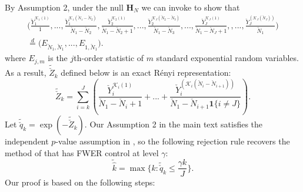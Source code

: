 \documentclass[11pt]{article}
\newcommand{\oo}{\bm{1}}
\begin{document}
	By Assumption 2, under the null $\bm{H}_{N}$ we can invoke \cite{Rnyi1953OnTT} to show that
	\begin{equation}
		\begin{split}
			\bigg(
			\frac{\check{Y}_1^{\mathcal{K}_1(1)}}{1},...,
			\frac{\check{Y}_1^{\mathcal{K}_1(\check{N}_{1}-\check{N}_2)}}{\check{N}_{1}-\check{N}_2}
			,
			\frac{\check{Y}_2^{\mathcal{K}_2(1)}}{\check{N}_{1}-\check{N}_2+1}
			,...,
			\frac{\check{Y}_2^{\mathcal{K}_J(\check{N}_{2}-\check{N}_3)}}{\check{N}_{1}-\check{N}_3}
			,...,
			\frac{\check{Y}_J^{\mathcal{K}_J(1)}}{\check{N}_1-\check{N}_J+1}
			,,...,
			\frac{\check{Y}_J^{(\mathcal{K}_J(\check{N}_J))}}{\check{N}_1}
			\bigg)\\
			\stackrel{d}{=}
			\bigg(
			E_{\check{N}_1,\check{N}_1},...,E_{1,\check{N}_1}
			\bigg).
		\end{split}
	\end{equation}
	where $E_{j,m}$ is the $j$th-order statistic of $m$ standard exponential random variables. As a result, $\tilde{\check{Z}}_k$ defined below is an exact R\'enyi representation:
	\begin{equation}\label{38}
		\tilde{\check{Z}}_k=\sum_{i=k}^J(
		\frac{\check{Y}_i^{\mathcal{K}_i(1)}}{\check{N}_1-\check{N}_i+1}+
		...+
		\frac{\check{Y}_i^{(\mathcal{K}_i(\check{N}_i-\check{N}_{i+1}))}}{\check{N}_1-\check{N}_{i+1}\oo\{i\neq J\}}
		).
	\end{equation}
	Let $\tilde{\check{q}}_k=\exp(-\tilde{\check{Z}}_k)$. Our Assumption 2 in the main text satisfies the independent $p$-value assumption in \cite{2336545}, so the following rejection rule recovers the method of \cite{2336545} that has FWER control at level $\gamma$:
	\begin{equation}\label{renyi_oned}
		\tilde{\hat{k}}=\max\{k:    \tilde{\check{q}}_k\leq\frac{\gamma k}{J}\}.
	\end{equation}
	Our proof is based on the following steps:
\end{document}

